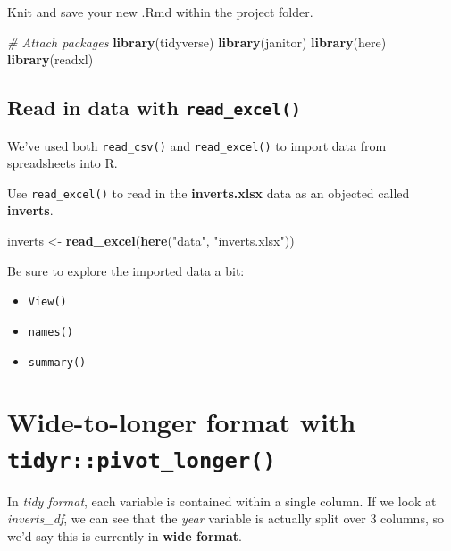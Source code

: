 \documentclass[]{book}
\newenvironment{Shaded}{\begin{snugshade}}{\end{snugshade}}
\newcommand{\CommentTok}[1]{\textcolor[rgb]{0.56,0.35,0.01}{\textit{#1}}}
\newcommand{\KeywordTok}[1]{\textcolor[rgb]{0.13,0.29,0.53}{\textbf{#1}}}
\newcommand{\NormalTok}[1]{#1}
\newcommand{\StringTok}[1]{\textcolor[rgb]{0.31,0.60,0.02}{#1}}
\providecommand{\tightlist}{%
  \setlength{\itemsep}{0pt}\setlength{\parskip}{0pt}}
\begin{document}
Knit and save your new .Rmd within the project folder.

\begin{Shaded}
\begin{Highlighting}[]
\CommentTok{# Attach packages}
\KeywordTok{library}\NormalTok{(tidyverse)}
\KeywordTok{library}\NormalTok{(janitor)}
\KeywordTok{library}\NormalTok{(here)}
\KeywordTok{library}\NormalTok{(readxl)}
\end{Highlighting}
\end{Shaded}

\hypertarget{read-in-data-with-read_excel}{%
\subsection{\texorpdfstring{Read in data with \texttt{read\_excel()}}{Read in data with read\_excel()}}\label{read-in-data-with-read_excel}}

We've used both \texttt{read\_csv()} and \texttt{read\_excel()} to import data from spreadsheets into R.

Use \texttt{read\_excel()} to read in the \textbf{inverts.xlsx} data as an objected called \textbf{inverts}.

\begin{Shaded}
\begin{Highlighting}[]
\NormalTok{inverts <-}\StringTok{ }\KeywordTok{read_excel}\NormalTok{(}\KeywordTok{here}\NormalTok{(}\StringTok{"data"}\NormalTok{, }\StringTok{"inverts.xlsx"}\NormalTok{))}
\end{Highlighting}
\end{Shaded}

Be sure to explore the imported data a bit:

\begin{itemize}
\tightlist
\item
  \texttt{View()}
\item
  \texttt{names()}
\item
  \texttt{summary()}
\end{itemize}

\hypertarget{wide-to-longer-format-with-tidyrpivot_longer}{%
\section{\texorpdfstring{Wide-to-longer format with \texttt{tidyr::pivot\_longer()}}{Wide-to-longer format with tidyr::pivot\_longer()}}\label{wide-to-longer-format-with-tidyrpivot_longer}}

In \emph{tidy format}, each variable is contained within a single column. If we look at \emph{inverts\_df}, we can see that the \emph{year} variable is actually split over 3 columns, so we'd say this is currently in \textbf{wide format}.
\end{document}
